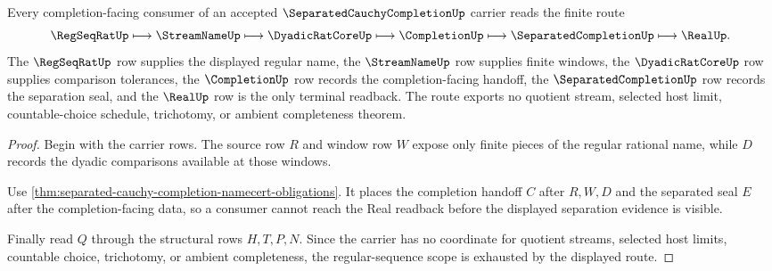 \begin{theorem}
\label{thm:separated-cauchy-completion-regseqrat-scope}
Every completion-facing consumer of an accepted $\SeparatedCauchyCompletionUp$ carrier reads the finite route
$$
\RegSeqRatUp \longmapsto \StreamNameUp \longmapsto \DyadicRatCoreUp \longmapsto \CompletionUp \longmapsto \SeparatedCompletionUp \longmapsto \RealUp .
$$
The $\RegSeqRatUp$ row supplies the displayed regular name, the $\StreamNameUp$ row supplies finite windows, the $\DyadicRatCoreUp$ row supplies comparison tolerances, the $\CompletionUp$ row records the completion-facing handoff, the $\SeparatedCompletionUp$ row records the separation seal, and the $\RealUp$ row is the only terminal readback. The route exports no quotient stream, selected host limit, countable-choice schedule, trichotomy, or ambient completeness theorem.
\end{theorem}
\begin{proof}
Begin with the carrier rows. The source row $R$ and window row $W$ expose only finite pieces of the regular rational name, while $D$ records the dyadic comparisons available at those windows.

Use \autoref{thm:separated-cauchy-completion-namecert-obligations}. It places the completion handoff $C$ after $R,W,D$ and the separated seal $E$ after the completion-facing data, so a consumer cannot reach the Real readback before the displayed separation evidence is visible.

Finally read $Q$ through the structural rows $H,T,P,N$. Since the carrier has no coordinate for quotient streams, selected host limits, countable choice, trichotomy, or ambient completeness, the regular-sequence scope is exhausted by the displayed route.
\end{proof}



